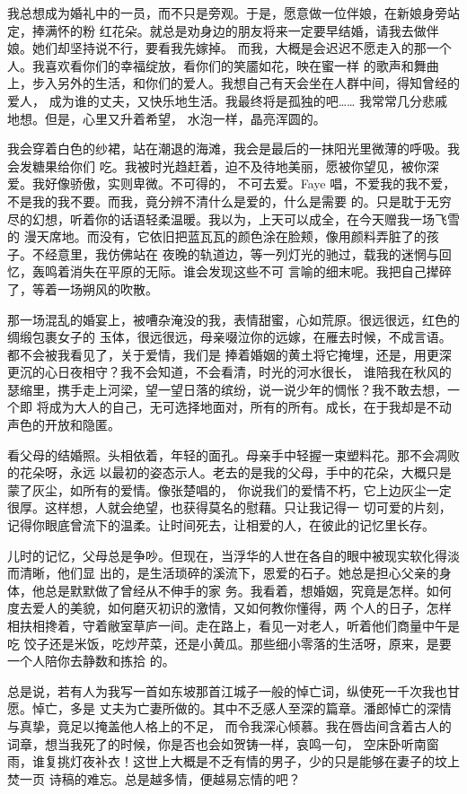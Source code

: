 		我总想成为婚礼中的一员，而不只是旁观。于是，愿意做一位伴娘，在新娘身旁站定，捧满怀的粉
	红花朵。就总是劝身边的朋友将来一定要早结婚，请我去做伴娘。她们却坚持说不行，要看我先嫁掉。
	而我，大概是会迟迟不愿走入的那一个人。我喜欢看你们的幸福绽放，看你们的笑靥如花，映在蜜一样
	的歌声和舞曲上，步入另外的生活，和你们的爱人。我想自己有天会坐在人群中间，得知曾经的爱人，
	成为谁的丈夫，又快乐地生活。我最终将是孤独的吧…… 我常常几分悲戚地想。但是，心里又升着希望，
	水泡一样，晶亮浑圆的。


		我会穿着白色的纱裙，站在潮退的海滩，我会是最后的一抹阳光里微薄的呼吸。我会发糖果给你们
	吃。我被时光趋赶着，迫不及待地美丽，愿被你望见，被你深爱。我好像骄傲，实则卑微。不可得的，
	不可去爱。Faye 唱，不爱我的我不爱，不是我的我不要。而我，竟分辨不清什么是爱的，什么是需要
	的。只是耽于无穷尽的幻想，听着你的话语轻柔温暖。我以为，上天可以成全，在今天赠我一场飞雪的
	漫天席地。而没有，它依旧把蓝瓦瓦的颜色涂在脸颊，像用颜料弄脏了的孩子。不经意里，我仿佛站在
	夜晚的轨道边，等一列灯光的驰过，载我的迷惘与回忆，轰鸣着消失在平原的无际。谁会发现这些不可
	言喻的细末呢。我把自己撵碎了，等着一场朔风的吹散。


		那一场混乱的婚宴上，被嘈杂淹没的我，表情甜蜜，心如荒原。很远很远，红色的绸缎包裹女子的
	玉体，很远很远，母亲啜泣你的远嫁，在雁去时候，不成言语。都不会被我看见了，关于爱情，我们是
	捧着婚姻的黄土将它掩埋，还是，用更深更沉的心日夜相守？我不会知道，不会看清，时光的河水很长，
	谁陪我在秋风的瑟缩里，携手走上河梁，望一望日落的缤纷，说一说少年的惆怅？我不敢去想，一个即
	将成为大人的自己，无可选择地面对，所有的所有。成长，在于我却是不动声色的开放和隐匿。


		看父母的结婚照。头相依着，年轻的面孔。母亲手中轻握一束塑料花。那不会凋败的花朵呀，永远
	以最初的姿态示人。老去的是我的父母，手中的花朵，大概只是蒙了灰尘，如所有的爱情。像张楚唱的，
	你说我们的爱情不朽，它上边灰尘一定很厚。这样想，人就会绝望，也获得莫名的慰藉。只让我记得一
	切可爱的片刻，记得你眼底曾流下的温柔。让时间死去，让相爱的人，在彼此的记忆里长存。


		儿时的记忆，父母总是争吵。但现在，当浮华的人世在各自的眼中被现实软化得淡而清晰，他们显
	出的，是生活琐碎的溪流下，恩爱的石子。她总是担心父亲的身体，他总是默默做了曾经从不伸手的家
	务。我看着，想婚姻，究竟是怎样。如何度去爱人的美貌，如何磨灭初识的激情，又如何教你懂得，两
	个人的日子，怎样相扶相搀着，守着敝室草庐一间。走在路上，看见一对老人，听着他们商量中午是吃
	饺子还是米饭，吃炒芹菜，还是小黄瓜。那些细小零落的生活呀，原来，是要一个人陪你去静数和拣拾
	的。


		总是说，若有人为我写一首如东坡那首江城子一般的悼亡词，纵使死一千次我也甘愿。悼亡，多是
	丈夫为亡妻所做的。其中不乏感人至深的篇章。潘郎悼亡的深情与真挚，竟足以掩盖他人格上的不足，
	而令我深心倾慕。我在唇齿间含着古人的词章，想当我死了的时候，你是否也会如贺铸一样，哀鸣一句，
	空床卧听南窗雨，谁复挑灯夜补衣！这世上大概是不乏有情的男子，少的只是能够在妻子的坟上焚一页
	诗稿的难忘。总是越多情，便越易忘情的吧？



